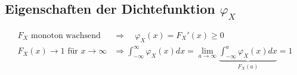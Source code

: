 \documentclass[10pt,a4paper]{scrartcl}
\newif\ifincludeExamples
\begin{document}
\subsection{Eigenschaften der Dichtefunktion $\varphi_X$ } %
\begin{align}
F_X \text{ monoton wachsend } &\Rightarrow \quad\varphi_X(x) = F_X'(x) \ge 0 \\
F_X(x) \to 1 \text{ für } x\to \infty &\Rightarrow \int_{-\infty}^\infty \varphi_X(x) dx 
  = \lim_{a\to\infty} \underbrace{\int_{-\infty}^a\varphi_X(x) dx}_{F_X(a)} = 1
\end{align}

\ifincludeExamples
\begin{align*}
\varphi(x) = \begin{cases}a\cos x & -\frac{\pi}{2} \le x \frac{\pi}{2} \\ 0 & \text{ sonst}\end{cases} \\
\varphi(x) \ge 0 & \forall x\in\mathbb{R} \text{ ok} \\
\int_{-\infty}^\infty \varphi(x) dx = \int_{-\frac{\pi}{2}}^\frac{\pi}{2} a\cos x dx = a\left[sin x\right]_{-\frac{\pi}{2}}^\frac{\pi}{2} = 2a
\end{align*}
Also eine gültige Dichtefunktion für $a=\frac{1}{2}$
\begin{align*}
F(X) = \int_{-\infty}^x \varphi(\xi)d\xi = \int_{-\frac{\pi}{2}}^x \frac{1}{2}\cos\xi d\xi = \frac{1}{2}\left(sin(x) + 1\right)
\end{align*}
\fi
\end{document}
